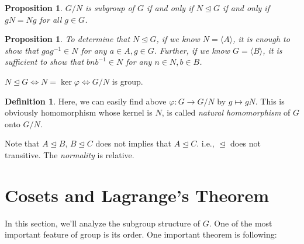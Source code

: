 \documentclass[12pt, a4paper, openany, twoside]{book}
\newtheorem{prop}[thm]{Proposition}
\theoremstyle{definition}
\newtheorem{defn}[thm]{Definition}
\theoremstyle{remark}
\theoremstyle{plain}
\numberwithin{equation}{section}
\begin{document}
\begin{prop}
    $G / N$ is subgroup of $G$ if and only if $N \trianglelefteq G$ if and only if $gN = Ng$ for all $g \in G$. 
\end{prop}

\begin{prop}
    To determine that $N \trianglelefteq G$, if we know $N = \langle A \rangle$, it is enough to show that 
    $gag^{-1} \in N$ for any $a \in A, g \in G$. Further, if we know $G = \langle B \rangle$, it is sufficient to show that 
    $bnb^{-1} \in N$ for any $n \in N, b \in B$. 
\end{prop}

\begin{tcolorbox}[colback=yellow!10!white,colframe=green!75!black,title=Proposition 7]

$N \trianglelefteq G \iff N = \ker \varphi \iff G / N$ is group.

\end{tcolorbox}

\begin{defn}

Here, we can easily find above $\varphi: G \rightarrow G/N$ by $g \mapsto gN$. This is obviously 
homomorphism whose kernel is $N$, is called \textit{natural homomorphism} of $G$ onto $G/N$. 

\end{defn}

\begin{tcolorbox}[colback=yellow!10!white,colframe=red!75!black,title=!Caution!]

Note that $A \trianglelefteq B$, $B \trianglelefteq C$ does not implies that $A \trianglelefteq C$. 
i.e., $\trianglelefteq$ does not transitive. The \textit{normality} is relative. 

\end{tcolorbox}

\begin{tcolorbox}[colback=yellow!10!white,colframe=violet!75!white,title=Exercise Sec 3.1.]
\end{tcolorbox}

\newpage 

\section{Cosets and Lagrange's Theorem}

In this section, we'll analyze the subgroup structure of $G$. One of the most important feature of group is its order. 
One important theorem is following: 
\end{document}
